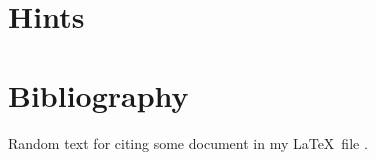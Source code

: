 \documentclass[12pt]{scrartcl}
\begin{document}
\newpage

\section{Hints}


\printhint

\newpage

\section{Bibliography}


Random text for citing some document in my \LaTeX\ file \cite{knuth1997}.

\printbibliography
\end{document}
